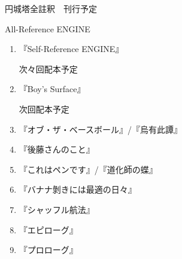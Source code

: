 \documentclass[10pt, a5paper, twoside]{ltjsarticle}
\theoremstyle{definition}
\begin{document}




	\begin{center}

		\Large{円城塔全註釈　刊行予定}

		\normalsize

		All-Reference ENGINE

	\end{center}

	\begin{enumerate}

		\item 『Self-Reference ENGINE』

		次々回配本予定

		\item 『Boy's Surface』

		次回配本予定

		\item 『オブ・ザ・ベースボール』/『烏有此譚』

			\vspace{3mm}

		\item 『後藤さんのこと』

			\vspace{3mm}

		\item 『これはペンです』/『道化師の蝶』

			\vspace{3mm}

		\item 『バナナ剝きには最適の日々』

			\vspace{3mm}

		\item 『シャッフル航法』

			\vspace{3mm}

		\item 『エピローグ』

			\vspace{3mm}

		\item 『プロローグ』

			\vspace{3mm}


\end{enumerate}
\end{document}

